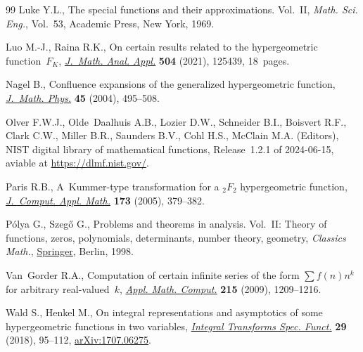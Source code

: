\documentclass[10pt,a4paper]{amsart}
\numberwithin{equation}{section}
\begin{document}
\begin{thebibliography}{99}
Luke Y.L., The special functions and their approximations. {V}ol.~{II},
 \textit{Math. Sci. Eng.}, Vol.~53, Academic Press, New York, 1969.

Luo M.-J., Raina R.K., On certain results related to the hypergeometric
 function~{$F_K$}, \href{https://doi.org/10.1016/j.jmaa.2021.125439}{\textit{J.~Math. Anal. Appl.}} \textbf{504} (2021), 125439,
 18~pages.

Nagel B., Confluence expansions of the generalized hypergeometric function,
 \href{https://doi.org/10.1063/1.1629777}{\textit{J.~Math. Phys.}} \textbf{45} (2004), 495--508.

Olver F.W.J., Olde~Daalhuis A.B., Lozier D.W., Schneider B.I., Boisvert R.F.,
 Clark C.W., Miller B.R., Saunders B.V., Cohl H.S., McClain M.A. (Editors),
 NIST digital library of mathematical functions, {R}elease~1.2.1 of
 2024-06-15, aviable at \url{https://dlmf.nist.gov/}.

Paris R.B., A~{K}ummer-type transformation for a {$_2F_2$} hypergeometric
 function, \href{https://doi.org/10.1016/j.cam.2004.05.005}{\textit{J.~Comput. Appl. Math.}} \textbf{173} (2005), 379--382.

P\'olya G., Szeg\H{o} G., Problems and theorems in analysis. {V}ol.~{II}:
 {T}heory of functions, zeros, polynomials, determinants, number theory,
 geometry, \textit{Classics Math.}, \href{https://doi.org/10.1007/978-3-642-61905-2}{Springer}, Berlin, 1998.

Van~Gorder R.A., Computation of certain infinite series of the form {$\sum
 f(n)n^k$} for arbitrary real-valued~{$k$}, \href{https://doi.org/10.1016/j.amc.2009.06.064}{\textit{Appl. Math. Comput.}}
 \textbf{215} (2009), 1209--1216.

Wald S., Henkel M., On integral representations and asymptotics of some
 hypergeometric functions in two variables, \href{https://doi.org/10.1080/10652469.2017.1404596}{\textit{Integral Transforms Spec.
 Funct.}} \textbf{29} (2018), 95--112, \href{https://arxiv.org/abs/1707.06275}{arXiv:1707.06275}.

\end{thebibliography}
\end{document}
